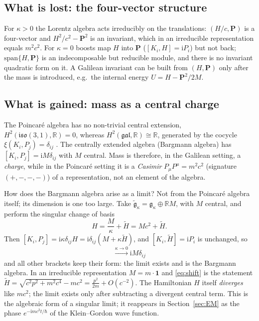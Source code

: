 \documentclass[11pt,a4paper]{article}
\newcommand{\ii}{\mathrm{i}}
\newcommand{\R}{\mathbb{R}}
\newcommand{\bP}{\mathbf{P}}
\newcommand{\gal}{\mathfrak{gal}}
\newcommand{\poinc}{\mathfrak{iso}(3,1)}
\theoremstyle{plain}
\theoremstyle{definition}
\theoremstyle{remark}
\begin{document}
\subsection{What is lost: the four-vector structure}
For $\kappa>0$ the Lorentz algebra acts irreducibly on the translations: $(H/c,\bP)$ is a
four-vector and $H^2/c^2-\bP^2$ is an invariant, which in an irreducible representation equals
$m^2c^2$. For $\kappa=0$ boosts map $H$ into $\bP$ ($[K_i,H]=\ii P_i$) but not back; $\mathrm{span}\{H,\bP\}$ is
an indecomposable but reducible module, and there is no invariant quadratic form on it. A Galilean
invariant can be built from $(H,\bP)$ only after the mass is introduced, e.g.\ the internal energy
$U=H-\bP^2/2M$.

\subsection{What is gained: mass as a central charge}\label{ssec:mass}
The Poincar\'e algebra has no non-trivial central extension, $H^2(\poinc,\R)=0$, whereas
$H^2(\gal,\R)\cong\R$, generated by the cocycle $\xi(K_i,P_j)=\delta_{ij}$ \cite{Bargmann54,LL63}.
The centrally extended algebra (Bargmann algebra) has $[K_i,P_j]=\ii M\delta_{ij}$ with $M$ central.
Mass is therefore, in the Galilean setting, a \emph{charge}, while in the Poincar\'e setting it is a
\emph{Casimir} $P_\mu P^\mu=m^2c^2$ (signature $(+,-,-,-)$) of a representation, not an element of the algebra.

How does the Bargmann algebra arise as a limit? Not from the Poincar\'e algebra itself; its dimension
is one too large. Take $\tilde{\mathfrak g}_\kappa=\mathfrak g_\kappa\oplus\R M$, with $M$ central,
and perform the singular change of basis
\begin{equation}\label{eq:shift}
H=\frac{M}{\kappa}+\tilde H=Mc^2+\tilde H .
\end{equation}
Then $[K_i,P_j]=\ii\kappa\delta_{ij}H=\ii\delta_{ij}(M+\kappa\tilde H)$, and $[K_i,\tilde H]=\ii P_i$ is unchanged, so
\begin{equation}
[K_i,P_j]\xrightarrow{\kappa\to0}\ii M\delta_{ij}
\end{equation}
and all other brackets keep their form: the limit exists and is the Bargmann algebra. In an
irreducible representation $M=m\cdot\mathbf 1$ and \eqref{eq:shift} is the statement
$\tilde H=\sqrt{c^2p^2+m^2c^4}-mc^2=\tfrac{p^2}{2m}+O(c^{-2})$. The Hamiltonian $H$ itself
\emph{diverges} like $mc^2$; the limit exists only after subtracting a divergent central term.
This is the algebraic form of a singular limit; it reappears in Section~\ref{sec:EM} as the phase
$e^{-\ii mc^2t/\hbar}$ of the Klein--Gordon wave function.
\end{document}
